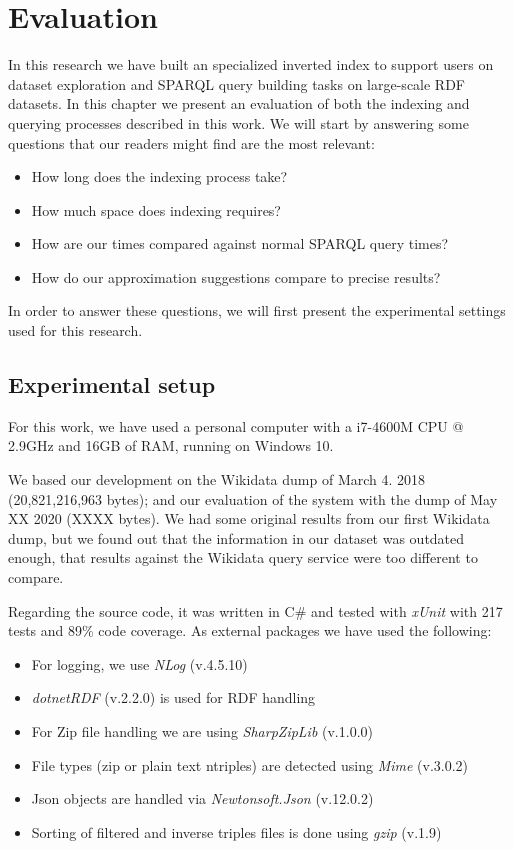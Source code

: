 \chapter{Evaluation}

In this research we have built an specialized inverted index to support users on dataset exploration and SPARQL query building tasks on large-scale RDF datasets. In this chapter we present an evaluation of both the indexing and querying processes described in this work. We will start by answering some questions that our readers might find are the most relevant:

\begin{itemize}
    \item How long does the indexing process take?
    \item How much space does indexing requires?
    \item How are our times compared against normal SPARQL query times?
    \item How do our approximation suggestions compare to precise results?
\end{itemize}

In order to answer these questions, we will first present the experimental settings used for this research.

\section{Experimental setup}

For this work, we have used a personal computer with a i7-4600M CPU @ 2.9GHz and 16GB of RAM, running on Windows 10.

We based our development on the Wikidata dump of March 4. 2018 (20,821,216,963 bytes); and our evaluation of the system with the dump of May XX 2020 (XXXX bytes). We had some original results from our first Wikidata dump, but we found out that the information in our dataset was outdated enough, that results against the Wikidata query service were too different to compare.

Regarding the source code, it was written in C\# and tested with \textit{xUnit} with 217 tests and 89\% code coverage. As external packages we have used the following:
\begin{itemize}
    \item For logging, we use \textit{NLog} (v.4.5.10)
    \item \textit{dotnetRDF} (v.2.2.0) is used for RDF handling
    \item For Zip file handling we are using \textit{SharpZipLib} (v.1.0.0)
    \item File types (zip or plain text ntriples) are detected using \textit{Mime} (v.3.0.2)
    \item Json objects are handled via \textit{Newtonsoft.Json} (v.12.0.2)
    \item Sorting of filtered and inverse triples files is done using \textit{gzip} (v.1.9)
\end{itemize}

